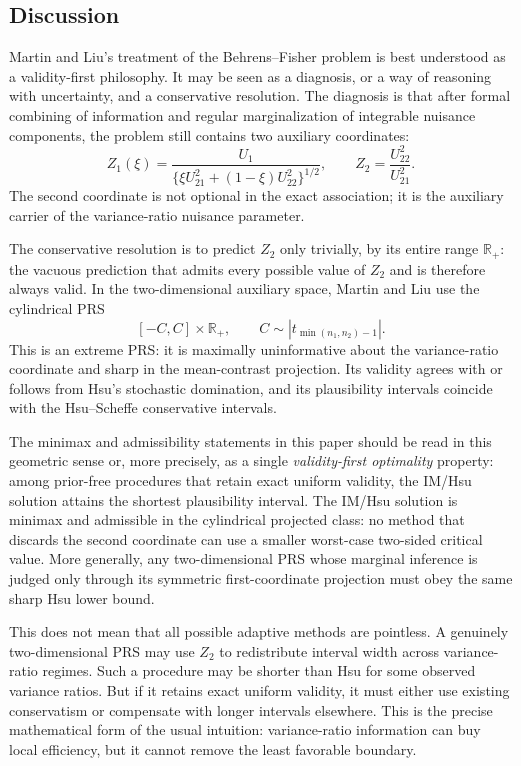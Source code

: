 \documentclass[12pt]{article}
\newcommand{\R}{\mathbb R}
\begin{document}
\subsection{Discussion}
\label{subsec:discussion}

Martin and Liu's treatment of the Behrens--Fisher problem is best understood
as a validity-first philosophy.  It may be seen as a diagnosis, or a way of
reasoning with uncertainty, and a conservative resolution.  The diagnosis is that after
formal combining of information and regular marginalization of integrable
nuisance components, the problem still contains two auxiliary coordinates:
\[
Z_1(\xi)
=
\frac{U_1}
{\{\xi U_{21}^2+(1-\xi)U_{22}^2\}^{1/2}},
\qquad
Z_2=\frac{U_{22}^2}{U_{21}^2}.
\]
The second coordinate is not optional in the exact association; it is the
auxiliary carrier of the variance-ratio nuisance parameter.

The conservative resolution is to predict \(Z_2\) only trivially, by its entire
range \(\R_+\): the vacuous prediction that admits every possible value of
\(Z_2\) and is therefore always valid.  In the two-dimensional auxiliary space,
Martin and Liu use the cylindrical PRS
\[
[-C,C]\times\R_+,
\qquad C\sim |t_{\min(n_1,n_2)-1}|.
\]
This is an extreme PRS: it is maximally uninformative about
the variance-ratio coordinate and sharp in the mean-contrast projection.  Its
validity agrees with or follows from Hsu's stochastic domination, and its
plausibility intervals coincide with the Hsu--Scheffe conservative intervals.

The minimax and admissibility statements in this paper should be read in this
geometric sense or, more precisely, as a single \emph{validity-first optimality}
property: among prior-free procedures that retain exact uniform validity, the
IM/Hsu solution attains the shortest plausibility interval.  The IM/Hsu solution
is minimax and admissible in
the cylindrical projected class: no method that discards the second coordinate
can use a smaller worst-case two-sided critical value.  More generally, any
two-dimensional PRS whose marginal inference is judged only through its
symmetric first-coordinate projection must obey the same sharp Hsu lower
bound.

This does not mean that all possible adaptive methods are pointless.  A
genuinely two-dimensional PRS may use \(Z_2\) to redistribute interval width
across variance-ratio regimes.  Such a procedure may be shorter than Hsu for
some observed variance ratios.  But if it retains exact uniform validity, it
must either use existing conservatism or compensate with longer intervals
elsewhere.  This is the precise mathematical form of the usual intuition:
variance-ratio information can buy local efficiency, but it cannot remove the
least favorable boundary.
\end{document}
